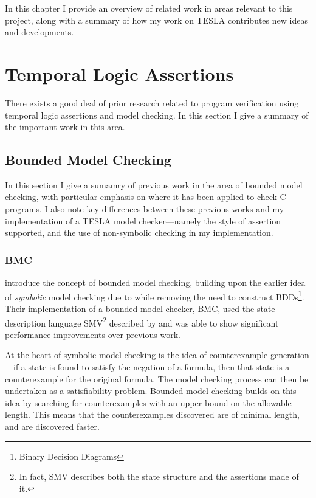 In this chapter I provide an overview of related work in areas relevant
to this project, along with a summary of how my work on TESLA
contributes new ideas and developments.

\section{Temporal Logic Assertions} \label{sec:bounded-model-checking}

There exists a good deal of prior research related to program
verification using temporal logic assertions and model checking. In this
section I give a summary of the important work in this area.

\subsection{Bounded Model Checking}

In this section I give a sumamry of previous work in the area of bounded
model checking, with particular emphasis on where it has been applied to
check C programs. I also note key differences between these previous
works and my implementation of a TESLA model checker---namely the style
of assertion supported, and the use of non-symbolic checking in my
implementation.

\subsubsection{BMC}

\textcite{biere_symbolic_1999} introduce the concept of bounded model
checking, building upon the earlier idea of \emph{symbolic} model
checking due to \textcite{mcmillan_symbolic_1992} while removing the
need to construct BDDs\footnote{Binary Decision Diagrams}. Their
implementation of a bounded model checker, BMC, used the state
description language SMV\footnote{In fact, SMV describes both the state
structure and the assertions made of it.} described by
\citeauthor{mcmillan_symbolic_1992} and was able to show significant
performance improvements over previous work.

At the heart of symbolic model checking is the idea of counterexample
generation---if a state is found to satisfy the negation of a formula,
then that state is a counterexample for the original formula. The model
checking process can then be undertaken as a satisfiability problem.
Bounded model checking builds on this idea by searching for
counterexamples with an upper bound on the allowable length. This means
that the counterexamples discovered are of minimal length, and are
discovered faster.

